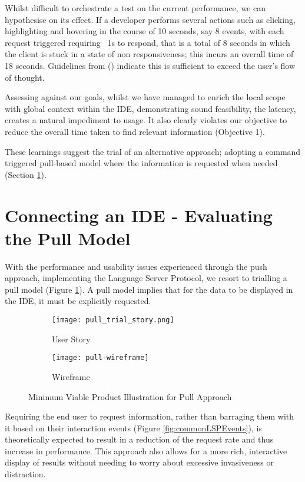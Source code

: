 Whilst difficult to orchestrate a test on the current performance, we can hypothesise on its effect. If a developer performs several actions such as clicking, highlighting and hovering in the course of 10 seconds, say 8 events, with each request triggered requiring ~1s to respond, that is a total of 8 seconds in which the client is stuck in a state of non responsiveness; this incurs an overall time of 18 seconds. Guidelines from \citeauthor{nielsen1994usability} (\citeyear{nielsen1994usability}) indicate this is sufficient to exceed the user's flow of thought. 

Assessing against our goals, whilst we have managed to enrich the local scope with global context within the IDE, demonstrating sound feasibility, the latency, creates a natural impediment to usage. It also clearly violates our objective to reduce the overall time taken to find relevant information (Objective 1).

These learnings suggest the trial of an alternative approach; adopting a command triggered pull-based model where the information is requested when needed (Section \ref{sec:evaluatingPullModel}).

\section{Connecting an IDE - Evaluating the Pull Model} \label{sec:evaluatingPullModel}

With the performance and usability issues experienced through the push approach, implementing the Language Server Protocol, we resort to trialling a pull model (Figure \ref{fig:mvpPull}). A pull model implies that for the data to be displayed in the IDE, it must be explicitly requested.

\begin{figure}[h!]
	\centering
	\begin{subfigure}[t]{0.3\textwidth}
		\texttt{[image: pull\_trial\_story.png]}
		\caption{User Story}
	\end{subfigure}
	\begin{subfigure}[t]{0.6\textwidth}
		\texttt{[image: pull-wireframe]}
		\caption{Wireframe}
	\end{subfigure}
	\caption{Minimum Viable Product Illustration for Pull Approach}
	\label{fig:mvpPull}
\end{figure}


Requiring the end user to request information, rather than barraging them with it based on their interaction events (Figure \ref{fig:commonLSPEvents}), is theoretically expected to result in a reduction of the request rate and thus increase in performance. This approach also allows for a more rich, interactive display of results without needing to worry about excessive invasiveness or distraction.

